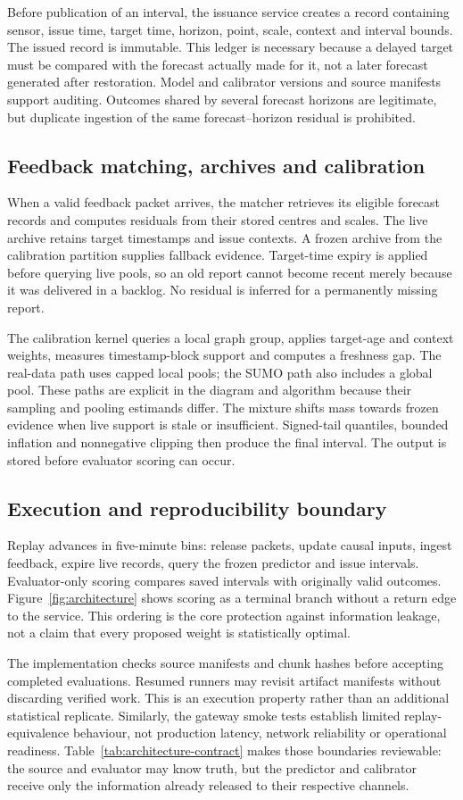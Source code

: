 Before publication of an interval, the issuance service creates a record containing sensor, issue time, target time, horizon, point, scale, context and interval bounds. The issued record is immutable. This ledger is necessary because a delayed target must be compared with the forecast actually made for it, not a later forecast generated after restoration. Model and calibrator versions and source manifests support auditing. Outcomes shared by several forecast horizons are legitimate, but duplicate ingestion of the same forecast--horizon residual is prohibited.

\subsection{Feedback matching, archives and calibration}
When a valid feedback packet arrives, the matcher retrieves its eligible forecast records and computes residuals from their stored centres and scales. The live archive retains target timestamps and issue contexts. A frozen archive from the calibration partition supplies fallback evidence. Target-time expiry is applied before querying live pools, so an old report cannot become recent merely because it was delivered in a backlog. No residual is inferred for a permanently missing report.

The calibration kernel queries a local graph group, applies target-age and context weights, measures timestamp-block support and computes a freshness gap. The real-data path uses capped local pools; the SUMO path also includes a global pool. These paths are explicit in the diagram and algorithm because their sampling and pooling estimands differ. The mixture shifts mass towards frozen evidence when live support is stale or insufficient. Signed-tail quantiles, bounded inflation and nonnegative clipping then produce the final interval. The output is stored before evaluator scoring can occur.

\subsection{Execution and reproducibility boundary}
Replay advances in five-minute bins: release packets, update causal inputs, ingest feedback, expire live records, query the frozen predictor and issue intervals. Evaluator-only scoring compares saved intervals with originally valid outcomes. Figure~\ref{fig:architecture} shows scoring as a terminal branch without a return edge to the service. This ordering is the core protection against information leakage, not a claim that every proposed weight is statistically optimal.

The implementation checks source manifests and chunk hashes before accepting completed evaluations. Resumed runners may revisit artifact manifests without discarding verified work. This is an execution property rather than an additional statistical replicate. Similarly, the gateway smoke tests establish limited replay-equivalence behaviour, not production latency, network reliability or operational readiness. Table~\ref{tab:architecture-contract} makes those boundaries reviewable: the source and evaluator may know truth, but the predictor and calibrator receive only the information already released to their respective channels.
